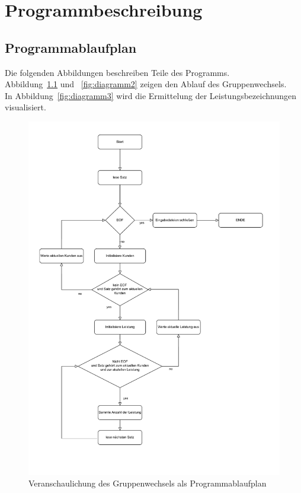 \chapter{Programmbeschreibung}\label{ch:programmbeschreibung}

\section{Programmablaufplan}\label{sec:pap}
Die folgenden Abbildungen beschreiben Teile des Programms.\\

Abbildung~\ref{fig:diagramm1} und ~\ref{fig:diagramm2} zeigen den Ablauf des Gruppenwechsels.\\

In Abbildung~\ref{fig:diagramm3} wird die Ermittelung der Leistungsbezeichnungen visualisiert.


\begin{figure}[!h]
    \centering
    \includegraphics[scale=0.9,width=\textwidth,height=\textheight,keepaspectratio]{images/Gruppenwechsel-PAP.pdf}
    \caption{
        Veranschaulichung des Gruppenwechsels als Programmablaufplan
    }
    \label{fig:diagramm1}
\end{figure}

